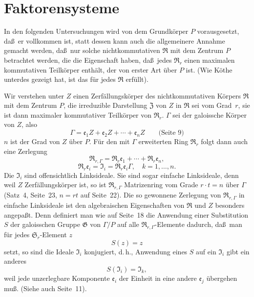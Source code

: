\documentclass[12pt,a4paper]{article}
\theoremstyle{plain}
\theoremstyle{definition}
\theoremstyle{remark}
\begin{document}
\newpage
\section{Faktorensysteme}\label{sec:23}

In den folgenden Untersuchungen wird von dem Grundk\"orper $P$ vorausgesetzt,
da\ss\ er vollkommen ist, statt dessen kann auch die allgemeinere Annahme
gemacht werden, da\ss\ nur solche nichtkommutativen $\mathfrak{R}$ mit dem Zentrum $P$
betrachtet werden, die die Eigenschaft haben, da\ss\ jedes $\mathfrak{R}_{r}$ einen maximalen
kommutativen Teilk\"orper enth\"alt, der von erster Art \"uber $P$ ist. (Wie
K\"othe unterdes gezeigt hat, ist das f\"ur jedes $\mathfrak{R}$ erf\"ullt).

Wir verstehen unter $Z$ einen Zerf\"allungsk\"orper des nichtkommutativen
K\"orpers $\mathfrak{R}$ mit dem Zentrum $P$, die irreduzible Darstellung $\mathfrak{Z}$ von $Z$ in
$\mathfrak{R}$ sei vom Grad~$r$, sie ist dann maximaler kommutativer Teilk\"orper von
$\mathfrak{R}_{r}$. $\varGamma$ sei der galoissche K\"orper von $Z$, also
\[
\varGamma = \mathfrak{e}_{1}Z + \mathfrak{e}_{2}Z + \cdots + \mathfrak{e}_{n}Z \qquad \text{(Seite~9)}
\]
$n$ ist der Grad von $Z$ \"uber $P$. F\"ur den mit $\varGamma$ erweiterten Ring $\mathfrak{R}_{r}$
folgt dann auch eine Zerlegung
\[
\mathfrak{R}_{r,\varGamma} = \mathfrak{R}_{r}\mathfrak{e}_{1} + \cdots + \mathfrak{R}_{r}\mathfrak{e}_{n},
\]
\[
\mathfrak{R}_{r}\mathfrak{e}_{i} = \mathfrak{I}_{i} = \mathfrak{R}_{r}\mathfrak{e}_{i}\varGamma, \quad k = 1, \ldots, n.
\]
Die $\mathfrak{I}_{i}$ sind offensichtlich Linksideale. Sie sind sogar einfache Linksideale,
denn weil $Z$ Zerf\"allungsk\"orper ist, so ist $\mathfrak{R}_{r,\varGamma}$ Matrizenring vom
Grade $r \cdot t = n$ \"uber $\varGamma$ (Satz~4, Seite~23, $n = rt$ auf Seite~22). Die so
gewonnene Zerlegung von $\mathfrak{R}_{r,\varGamma}$ in einfache Linksideale ist den algebraischen
Eigenschaften von $\mathfrak{R}$ und $Z$ besonders angepa\ss t. Denn definiert man wie auf
Seite~18 die Anwendung einer Substitution $S$ der galoisschen Gruppe
$\mathfrak{G}$ von $\varGamma/P$ auf alle $\mathfrak{R}_{r,\varGamma}$-Elemente dadurch, da\ss\ man f\"ur jedes
$\mathfrak{S}_{r}$-Element $z$
\[
S(z) = z
\]
setzt, so sind die Ideale $\mathfrak{I}_{i}$ konjugiert, d.\,h., Anwendung eines $S$ auf ein
$\mathfrak{I}_{i}$ gibt ein anderes
\[
S(\mathfrak{I}_{i}) = \mathfrak{I}_{k},
\]
weil jede unzerlegbare Komponente $\mathfrak{e}_{i}$ der Einheit in eine andere
$\mathfrak{e}_{j}$ \"ubergehen mu\ss. (Siehe auch Seite~11).
\end{document}
